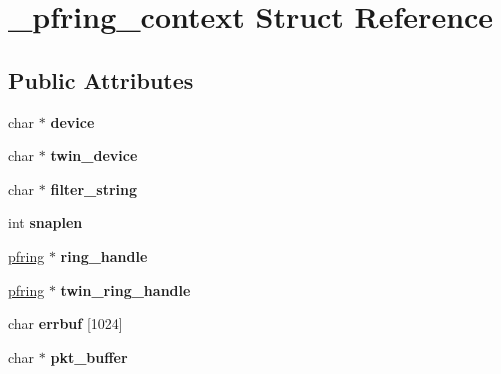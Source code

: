 \hypertarget{struct__pfring__context}{
\section{\_\-pfring\_\-context Struct Reference}
\label{struct__pfring__context}
}
\subsection*{Public Attributes}
\begin{DoxyCompactItemize}
\item 
\hypertarget{struct__pfring__context_ae946299df8213149ed1c0058f5777388}{
char $\ast$ {\bfseries device}}
\label{struct__pfring__context_ae946299df8213149ed1c0058f5777388}

\item 
\hypertarget{struct__pfring__context_ad45069df35928f348f834a9a81e41c9a}{
char $\ast$ {\bfseries twin\_\-device}}
\label{struct__pfring__context_ad45069df35928f348f834a9a81e41c9a}

\item 
\hypertarget{struct__pfring__context_a6d551c8f48a3ed6f9d5593e7e935db93}{
char $\ast$ {\bfseries filter\_\-string}}
\label{struct__pfring__context_a6d551c8f48a3ed6f9d5593e7e935db93}

\item 
\hypertarget{struct__pfring__context_a75011086e302c37ca550357ebd8847bc}{
int {\bfseries snaplen}}
\label{struct__pfring__context_a75011086e302c37ca550357ebd8847bc}

\item 
\hypertarget{struct__pfring__context_ab23089c0e6f17715a0ee7ce3a8c31371}{
\hyperlink{struct____pfring}{pfring} $\ast$ {\bfseries ring\_\-handle}}
\label{struct__pfring__context_ab23089c0e6f17715a0ee7ce3a8c31371}

\item 
\hypertarget{struct__pfring__context_ae4266ad3b6101c9bc47c769d2d2ecbd4}{
\hyperlink{struct____pfring}{pfring} $\ast$ {\bfseries twin\_\-ring\_\-handle}}
\label{struct__pfring__context_ae4266ad3b6101c9bc47c769d2d2ecbd4}

\item 
\hypertarget{struct__pfring__context_ae8570fb4a636c29a2477f2e7802267cd}{
char {\bfseries errbuf} \mbox{[}1024\mbox{]}}
\label{struct__pfring__context_ae8570fb4a636c29a2477f2e7802267cd}

\item 
\hypertarget{struct__pfring__context_ae5ef1316ccdd77394358de400a0a6906}{
char $\ast$ {\bfseries pkt\_\-buffer}}
\label{struct__pfring__context_ae5ef1316ccdd77394358de400a0a6906}


\end{DoxyCompactItemize}
